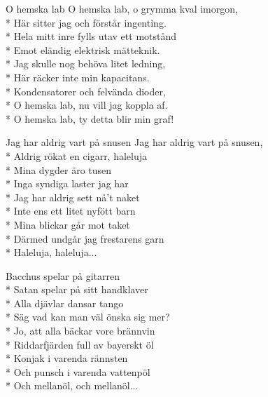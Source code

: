 \documentclass[a4paper, twoside, titlepage]{blad}
\begin{document}
\begin{sang}{O hemska lab}
O hemska lab, o grymma kval imorgon,\\*
Här sitter jag och förstår ingenting.\\*
Hela mitt inre fylls utav ett motstånd\\*
Emot eländig elektrisk mätteknik.\\*
Jag skulle nog behöva litet ledning,\\*
Här räcker inte min kapacitans.\\*
Kondensatorer och felvända dioder,\\*
O hemska lab, nu vill jag koppla af.\\*
O hemska lab, ty detta blir min graf!
\end{sang}


\begin{sang}{Jag har aldrig vart på snusen}
Jag har aldrig vart på snusen,\\*
Aldrig rökat en cigarr, haleluja\\*
Mina dygder äro tusen\\*
Inga syndiga laster jag har\\*
Jag har aldrig sett nå't naket\\*
Inte ens ett litet nyfött barn\\*
Mina blickar går mot taket\\*
Därmed undgår jag frestarens garn\\*
Haleluja, haleluja...

Bacchus spelar på gitarren\\*
Satan spelar på sitt handklaver\\*
Alla djävlar dansar tango\\*
Säg vad kan man väl önska sig mer?\\*
Jo, att alla bäckar vore brännvin\\*
Riddarfjärden full av bayerskt öl\\*
Konjak i varenda rännsten\\*
Och punsch i varenda vattenpöl\\*
Och mellanöl, och mellanöl... 
\end{sang}
\end{document}

